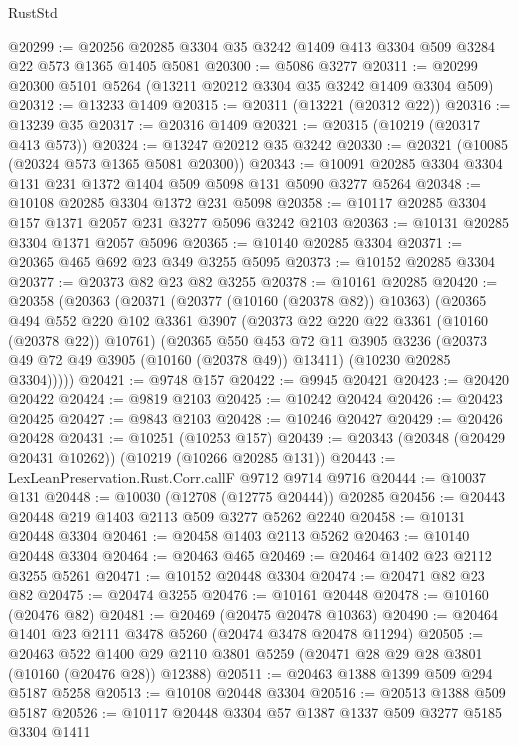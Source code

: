 \begin{lexlean}{RustStd}
\begin{coremodule}
@20299 := @20256 @20285 @3304 @35 @3242 @1409 @413 @3304 @509 @3284 @22 @573 @1365 @1405 @5081
@20300 := @5086 @3277
@20311 := @20299 @20300 @5101 @5264 (@13211 @20212 @3304 @35 @3242 @1409 @3304 @509)
@20312 := @13233 @1409
@20315 := @20311 (@13221 (@20312 @22))
@20316 := @13239 @35
@20317 := @20316 @1409
@20321 := @20315 (@10219 (@20317 @413 @573))
@20324 := @13247 @20212 @35 @3242
@20330 := @20321 (@10085 (@20324 @573 @1365 @5081 @20300))
@20343 := @10091 @20285 @3304 @3304 @131 @231 @1372 @1404 @509 @5098 @131 @5090 @3277 @5264
@20348 := @10108 @20285 @3304 @1372 @231 @5098
@20358 := @10117 @20285 @3304 @157 @1371 @2057 @231 @3277 @5096 @3242 @2103
@20363 := @10131 @20285 @3304 @1371 @2057 @5096
@20365 := @10140 @20285 @3304
@20371 := @20365 @465 @692 @23 @349 @3255 @5095
@20373 := @10152 @20285 @3304
@20377 := @20373 @82 @23 @82 @3255
@20378 := @10161 @20285
@20420 := @20358
    (@20363
      (@20371
        (@20377 (@10160 (@20378 @82)) @10363)
        (@20365
          @494
          @552
          @220
          @102
          @3361
          @3907
          (@20373 @22 @220 @22 @3361 (@10160 (@20378 @22)) @10761)
          (@20365
            @550
            @453
            @72
            @11
            @3905
            @3236
            (@20373 @49 @72 @49 @3905 (@10160 (@20378 @49)) @13411)
            (@10230 @20285 @3304)))))
@20421 := @9748 @157
@20422 := @9945 @20421
@20423 := @20420 @20422
@20424 := @9819 @2103
@20425 := @10242 @20424
@20426 := @20423 @20425
@20427 := @9843 @2103
@20428 := @10246 @20427
@20429 := @20426 @20428
@20431 := @10251 (@10253 @157)
@20439 := @20343 (@20348 (@20429 @20431 @10262)) (@10219 (@10266 @20285 @131))
@20443 := LexLeanPreservation.Rust.Corr.callF @9712 @9714 @9716
@20444 := @10037 @131
@20448 := @10030 (@12708 (@12775 @20444)) @20285
@20456 := @20443 @20448 @219 @1403 @2113 @509 @3277 @5262 @2240
@20458 := @10131 @20448 @3304
@20461 := @20458 @1403 @2113 @5262
@20463 := @10140 @20448 @3304
@20464 := @20463 @465
@20469 := @20464 @1402 @23 @2112 @3255 @5261
@20471 := @10152 @20448 @3304
@20474 := @20471 @82 @23 @82
@20475 := @20474 @3255
@20476 := @10161 @20448
@20478 := @10160 (@20476 @82)
@20481 := @20469 (@20475 @20478 @10363)
@20490 := @20464 @1401 @23 @2111 @3478 @5260 (@20474 @3478 @20478 @11294)
@20505 := @20463
    @522
    @1400
    @29
    @2110
    @3801
    @5259
    (@20471 @28 @29 @28 @3801 (@10160 (@20476 @28)) @12388)
@20511 := @20463 @1388 @1399 @509 @294 @5187 @5258
@20513 := @10108 @20448 @3304
@20516 := @20513 @1388 @509 @5187
@20526 := @10117 @20448 @3304 @57 @1387 @1337 @509 @3277 @5185 @3304 @1411

\end{coremodule}
\end{lexlean}
